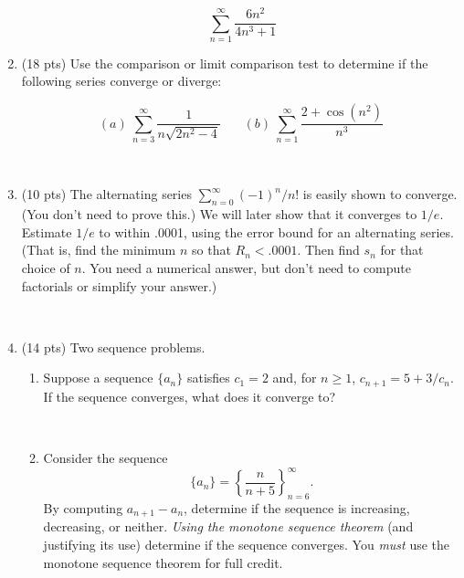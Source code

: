 \documentclass[11pt, oneside]{article}   	%
\begin{document}
\begin{enumerate}
$$ \ \sum_{n=1}^{\infty} \dfrac{6n^2}{4n^3+1} $$

\item (18 pts) Use the comparison or limit comparison test to determine if the following series converge or diverge:

$$(a) \ \sum_{n=3}^{\infty} \dfrac{1}{n\sqrt{2n^2-4}} \ \ \ \ \ \ \ \ (b) \ \sum_{n=1}^{\infty} \dfrac{2+\cos(n^2)}{n^3} $$

\

\item (10 pts) The alternating series $\sum_{n=0}^{\infty} (-1)^n/n!$ is easily shown to converge.  (You don't need to prove this.) We will later show that it converges to $1/e$. Estimate $1/e$ to within .0001, using the error bound for an alternating series. (That is, find the minimum $n$ so that $R_n<.0001.$ Then find $s_n$ for that choice of $n$. You need a numerical answer, but don't need to compute factorials or simplify your answer.)

\

\item (14 pts) Two sequence problems.

\begin{enumerate} 



\item Suppose a sequence $\{ a_n \}$ satisfies $c_1=2$ and, for $n \ge 1$, $c_{n+1}=5+3/c_n$. If the sequence converges, what does it converge to?

\

\item Consider the sequence $$\{a_n\}=\left\{\dfrac{n}{n+5} \right\}_{n=6}^{\infty}.$$ By computing $a_{n+1}-a_n$, determine if the sequence is increasing, decreasing, or neither. \emph{Using the monotone sequence theorem} (and justifying its use) determine if the sequence converges. You \emph{must} use the monotone sequence theorem for full credit.



\end{enumerate}



\end{enumerate}
\end{document}
